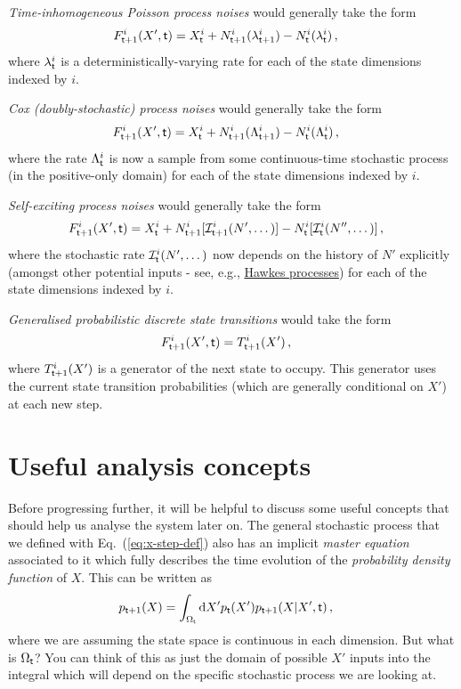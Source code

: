 \documentclass{book}
\begin{document}
\emph{Time-inhomogeneous Poisson process noises} would generally take the form
\begin{align}
& F^{i}_{{\sf t}+1}(X',{\sf t}) = X^i_{\sf t} + N^i_{{\sf t}+1}({\lambda^i_{{\sf t}+1}})-N^i_{\sf t}({\lambda^i_{\sf t}}) \,,
\end{align}
where $\lambda^i_{\sf t}$ is a deterministically-varying rate for each of the state dimensions indexed by $i$.

\emph{Cox (doubly-stochastic) process noises} would generally take the form
\begin{align}
& F^{i}_{{\sf t}+1}(X',{\sf t}) = X^i_{\sf t} + N^i_{{\sf t}+1}({\Lambda^i_{{\sf t}+1}})-N^i_{\sf t}({\Lambda^i_{\sf t}}) \,,
\end{align}
where the rate $\Lambda^i_{\sf t}$ is now a sample from some continuous-time stochastic process (in the positive-only domain) for each of the state dimensions indexed by $i$.

\emph{Self-exciting process noises} would generally take the form
\begin{align}
& F^{i}_{{\sf t}+1}(X',{\sf t}) = X^i_{\sf t} + N^i_{{\sf t}+1}[{\cal I}^i_{{\sf t}+1}(N', \dots)]-N^i_{\sf t}[{\cal I}^i_{\sf t}(N'', \dots)]\,,
\end{align}
where the stochastic rate ${\cal I}^i_{\sf t}(N', \dots)$ now depends on the history of $N'$ explicitly (amongst other potential inputs - see, e.g., \href{https://en.wikipedia.org/wiki/Hawkes_process}{Hawkes processes}) for each of the state dimensions indexed by $i$.

\emph{Generalised probabilistic discrete state transitions} would take the form
\begin{align}
& F^{i}_{{\sf t}+1}(X',{\sf t}) = T^i_{{\sf t}+1}(X')\,,
\end{align}
where $T^i_{{\sf t}+1}(X')$ is a generator of the next state to occupy. This generator uses the current state transition probabilities (which are generally conditional on $X'$) at each new step.

\section{\sffamily Useful analysis concepts}

Before progressing further, it will be helpful to discuss some useful concepts that should help us analyse the system later on. The general stochastic process that we defined with Eq.~(\ref{eq:x-step-def}) also has an implicit \emph{master equation} associated to it which fully describes the time evolution of the \emph{probability density function} of $X$. This can be written as
\begin{align}
p_{{\sf t}+1}(X) &= \int_{\Omega_{\sf t}}{\rm d}X' p_{\sf t}(X') p_{{\sf t}+1}(X\vert X',{\sf t}) \label{eq:master-x-cont} \,,
\end{align}
where we are assuming the state space is continuous in each dimension. But what is $\Omega_{\sf t}$? You can think of this as just the domain of possible $X'$ inputs into the integral which will depend on the specific stochastic process we are looking at.
\end{document}
